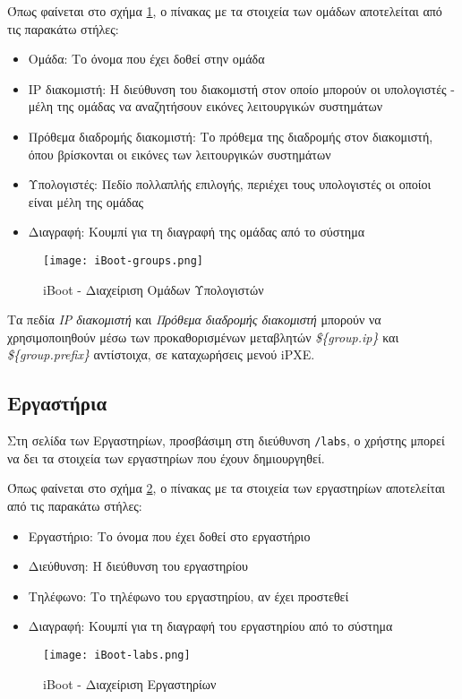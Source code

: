 Όπως φαίνεται στο σχήμα \ref{fig:iBoot_groups}, ο πίνακας με τα στοιχεία των ομάδων αποτελείται από τις παρακάτω στήλες:
\begin{itemize}
	\item Ομάδα: Το όνομα που έχει δοθεί στην ομάδα
	\item IP διακομιστή: Η διεύθυνση του διακομιστή στον οποίο μπορούν οι υπολογιστές - μέλη της ομάδας να αναζητήσουν εικόνες λειτουργικών συστημάτων
	\item Πρόθεμα διαδρομής διακομιστή: Το πρόθεμα της διαδρομής στον διακομιστή, όπου βρίσκονται οι εικόνες των λειτουργικών συστημάτων
	\item Υπολογιστές: Πεδίο πολλαπλής επιλογής, περιέχει τους υπολογιστές οι οποίοι είναι μέλη της ομάδας
	\item Διαγραφή: Κουμπί για τη διαγραφή της ομάδας από το σύστημα
\end{itemize}

\begin{figure}[ht]
	\centering
	\texttt{[image: iBoot-groups.png]}
	\caption{iBoot - Διαχείριση Ομάδων Υπολογιστών}
	\label{fig:iBoot_groups}
\end{figure}

Τα πεδία \emph{IP διακομιστή} και \emph{Πρόθεμα διαδρομής διακομιστή} μπορούν να χρησιμοποιηθούν μέσω των προκαθορισμένων μεταβλητών \emph{\$\{group.ip\}} και \emph{\$\{group.prefix\}} αντίστοιχα, σε καταχωρήσεις μενού iPXE.
\FloatBarrier

\subsection{Εργαστήρια}
\FloatBarrier
Στη σελίδα των Εργαστηρίων, προσβάσιμη στη διεύθυνση \verb!/labs!, ο χρήστης μπορεί να δει τα στοιχεία των εργαστηρίων που έχουν δημιουργηθεί.

Όπως φαίνεται στο σχήμα \ref{fig:iBoot_labs}, ο πίνακας με τα στοιχεία των εργαστηρίων αποτελείται από τις παρακάτω στήλες:
\begin{itemize}
	\item Εργαστήριο: Το όνομα που έχει δοθεί στο εργαστήριο
	\item Διεύθυνση: Η διεύθυνση του εργαστηρίου
	\item Τηλέφωνο: Το τηλέφωνο του εργαστηρίου, αν έχει προστεθεί
	\item Διαγραφή: Κουμπί για τη διαγραφή του εργαστηρίου από το σύστημα
\end{itemize}
\begin{figure}[ht]
	\centering
	\texttt{[image: iBoot-labs.png]}
	\caption{iBoot - Διαχείριση Εργαστηρίων}
	\label{fig:iBoot_labs}
\end{figure}
\FloatBarrier

